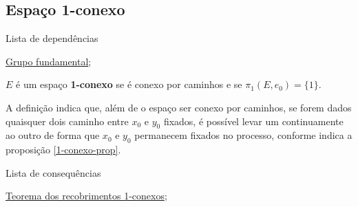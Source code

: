 \subsection{Espaço 1-conexo}
\label{espaço-1-conexo-def}
\begin{titlemize}{Lista de dependências}
	\item \hyperref[grupo-fundamental-def]{Grupo fundamental};\\ %
\end{titlemize}

\begin{defi}
	$E$ é um espaço \textbf{1-conexo} se é conexo por caminhos e se $\pi_1(E, e_0)=\{1\}$.
\end{defi}

A definição indica que, além de o espaço ser conexo por caminhos, se forem dados quaisquer dois caminho entre $x_0$ e $y_0$ fixados, é possível levar um continuamente ao outro de forma que $x_0$ e $y_0$ permanecem fixados no processo, conforme indica a proposição \ref{1-conexo-prop}.

\begin{titlemize}{Lista de consequências}
	\item \hyperref[recobrimento-1-conexo-prop]{Teorema dos recobrimentos 1-conexos};\\ %
\end{titlemize}

